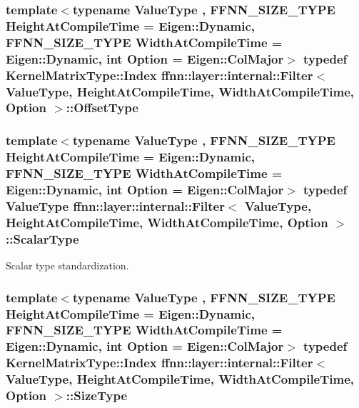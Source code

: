\hypertarget{structffnn_1_1layer_1_1internal_1_1_filter_a543008f199d45ea3c353751c78489a4b}{
\subsubsection[{Offset\-Type}]{\setlength{\rightskip}{0pt plus 5cm}template$<$typename Value\-Type , F\-F\-N\-N\-\_\-\-S\-I\-Z\-E\-\_\-\-T\-Y\-P\-E Height\-At\-Compile\-Time = Eigen\-::\-Dynamic, F\-F\-N\-N\-\_\-\-S\-I\-Z\-E\-\_\-\-T\-Y\-P\-E Width\-At\-Compile\-Time = Eigen\-::\-Dynamic, int Option = Eigen\-::\-Col\-Major$>$ typedef Kernel\-Matrix\-Type\-::\-Index {\bf ffnn\-::layer\-::internal\-::\-Filter}$<$ Value\-Type, Height\-At\-Compile\-Time, Width\-At\-Compile\-Time, Option $>$\-::{\bf Offset\-Type}}}\label{structffnn_1_1layer_1_1internal_1_1_filter_a543008f199d45ea3c353751c78489a4b}
\hypertarget{structffnn_1_1layer_1_1internal_1_1_filter_a918a7aa5f9b29d645c90dcc34af35f84}{
\subsubsection[{Scalar\-Type}]{\setlength{\rightskip}{0pt plus 5cm}template$<$typename Value\-Type , F\-F\-N\-N\-\_\-\-S\-I\-Z\-E\-\_\-\-T\-Y\-P\-E Height\-At\-Compile\-Time = Eigen\-::\-Dynamic, F\-F\-N\-N\-\_\-\-S\-I\-Z\-E\-\_\-\-T\-Y\-P\-E Width\-At\-Compile\-Time = Eigen\-::\-Dynamic, int Option = Eigen\-::\-Col\-Major$>$ typedef Value\-Type {\bf ffnn\-::layer\-::internal\-::\-Filter}$<$ Value\-Type, Height\-At\-Compile\-Time, Width\-At\-Compile\-Time, Option $>$\-::{\bf Scalar\-Type}}}\label{structffnn_1_1layer_1_1internal_1_1_filter_a918a7aa5f9b29d645c90dcc34af35f84}


Scalar type standardization. 

\hypertarget{structffnn_1_1layer_1_1internal_1_1_filter_adaf4459cd0d17e558b5f5f4773bacf97}{
\subsubsection[{Size\-Type}]{\setlength{\rightskip}{0pt plus 5cm}template$<$typename Value\-Type , F\-F\-N\-N\-\_\-\-S\-I\-Z\-E\-\_\-\-T\-Y\-P\-E Height\-At\-Compile\-Time = Eigen\-::\-Dynamic, F\-F\-N\-N\-\_\-\-S\-I\-Z\-E\-\_\-\-T\-Y\-P\-E Width\-At\-Compile\-Time = Eigen\-::\-Dynamic, int Option = Eigen\-::\-Col\-Major$>$ typedef Kernel\-Matrix\-Type\-::\-Index {\bf ffnn\-::layer\-::internal\-::\-Filter}$<$ Value\-Type, Height\-At\-Compile\-Time, Width\-At\-Compile\-Time, Option $>$\-::{\bf Size\-Type}}}\label{structffnn_1_1layer_1_1internal_1_1_filter_adaf4459cd0d17e558b5f5f4773bacf97}


